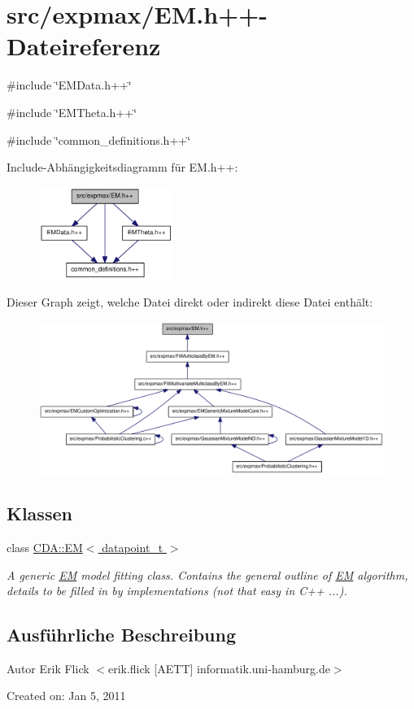 \hypertarget{EM_8h_09_09}{
\section{src/expmax/EM.h++-\/Dateireferenz}
\label{EM_8h_09_09}
}
{\ttfamily \#include \char`\"{}EMData.h++\char`\"{}}\par
{\ttfamily \#include \char`\"{}EMTheta.h++\char`\"{}}\par
{\ttfamily \#include \char`\"{}common\_\-definitions.h++\char`\"{}}\par
Include-\/Abhängigkeitsdiagramm für EM.h++:\nopagebreak
\begin{figure}[H]
\begin{center}
\leavevmode
\includegraphics[width=124pt]{EM_8h_09_09__incl}
\end{center}
\end{figure}
Dieser Graph zeigt, welche Datei direkt oder indirekt diese Datei enthält:\nopagebreak
\begin{figure}[H]
\begin{center}
\leavevmode
\includegraphics[width=380pt]{EM_8h_09_09__dep__incl}
\end{center}
\end{figure}
\subsection*{Klassen}
\begin{DoxyCompactItemize}
\item 
class \hyperlink{classCDA_1_1EM}{CDA::EM$<$ datapoint\_\-t $>$}
\begin{DoxyCompactList}\small\item\em A generic \hyperlink{classCDA_1_1EM}{EM} model fitting class. Contains the general outline of \hyperlink{classCDA_1_1EM}{EM} algorithm, details to be filled in by implementations (not that easy in C++ ...). \item\end{DoxyCompactList}\end{DoxyCompactItemize}


\subsection{Ausführliche Beschreibung}
\begin{DoxyAuthor}{Autor}
Erik Flick $<$erik.flick \mbox{[}AETT\mbox{]} informatik.uni-\/hamburg.de$>$
\end{DoxyAuthor}
Created on: Jan 5, 2011 